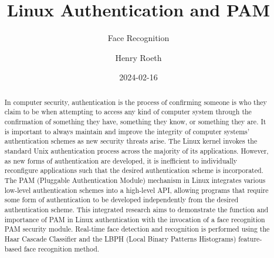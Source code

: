 \documentclass[
]{article}
\title{Linux Authentication and PAM}
\subtitle{Face Recognition}
\author{Henry Roeth}
\date{2024-02-16}
\begin{document}
\maketitle
\begin{abstract}
In computer security, authentication is the process of confirming
someone is who they claim to be when attempting to access any kind of
computer system through the confirmation of something they have,
something they know, or something they are. It is important to always
maintain and improve the integrity of computer systems' authentication
schemes as new security threats arise. The Linux kernel invokes the
standard Unix authentication process across the majority of its
applications. However, as new forms of authentication are developed, it
is inefficient to individually reconfigure applications such that the
desired authentication scheme is incorporated. The PAM (Pluggable
Authentication Module) mechanism in Linux integrates various low-level
authentication schemes into a high-level API, allowing programs that
require some form of authentication to be developed independently from
the desired authentication scheme. This integrated research aims to
demonstrate the function and importance of PAM in Linux authentication
with the invocation of a face recognition PAM security module. Real-time
face detection and recognition is performed using the Haar Cascade
Classifier and the LBPH (Local Binary Patterns Histograms) feature-based
face recognition method.
\end{abstract}
\end{document}
